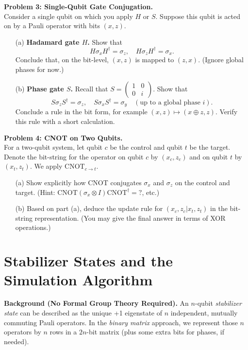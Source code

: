 \documentclass{article}
\begin{document}
\begin{question}
    \textbf{Problem 3: Single-Qubit Gate Conjugation.}\\
    Consider a single qubit on which you apply \(H\) or \(S\). Suppose this qubit is acted on by a Pauli operator with bits \((x, z)\).
    \begin{enumerate}
        \item[(a)] \textbf{Hadamard gate \(H\).} Show that
        \[
        H \sigma_x H^\dagger = \sigma_z, \quad H \sigma_z H^\dagger = \sigma_x.
        \]
        Conclude that, on the bit-level, \((x, z)\) is mapped to \((z, x)\). (Ignore global phases for now.)
        
        \item[(b)] \textbf{Phase gate \(S\).} Recall that \(S = \begin{pmatrix}1 & 0 \\ 0 & i\end{pmatrix}\). Show that
        \[
        S \sigma_z S^\dagger = \sigma_z, \quad S \sigma_x S^\dagger = \sigma_y \quad (\text{up to a global phase } i).
        \]
        Conclude a rule in the bit form, for example \((x, z) \mapsto (x \oplus z, z)\). Verify this rule with a short calculation.
    \end{enumerate}
\end{question}

\begin{question}
    \textbf{Problem 4: CNOT on Two Qubits.}\\
    For a two-qubit system, let qubit \(c\) be the control and qubit \(t\) be the target. Denote the bit-string for the operator on qubit \(c\) by \((x_c, z_c)\) and on qubit \(t\) by \((x_t, z_t)\). We apply \(\text{CNOT}_{c \to t}\).
    \begin{enumerate}
        \item[(a)] Show explicitly how CNOT conjugates \(\sigma_x\) and \(\sigma_z\) on the control and target. (Hint: \(\text{CNOT}(\sigma_x \otimes I)\text{CNOT}^\dagger = ?\), etc.)
        
        \item[(b)] Based on part (a), deduce the update rule for \((x_c, z_c | x_t, z_t)\) in the bit-string representation. (You may give the final answer in terms of XOR operations.)
    \end{enumerate}
\end{question}

\section*{Stabilizer States and the Simulation Algorithm}
\textbf{Background (No Formal Group Theory Required).} An \(n\)-qubit \textit{stabilizer state} can be described as the unique +1 eigenstate of \(n\) independent, mutually commuting Pauli operators. In the \textit{binary matrix} approach, we represent those \(n\) operators by \(n\) rows in a \(2n\)-bit matrix (plus some extra bits for phases, if needed).
\end{document}
